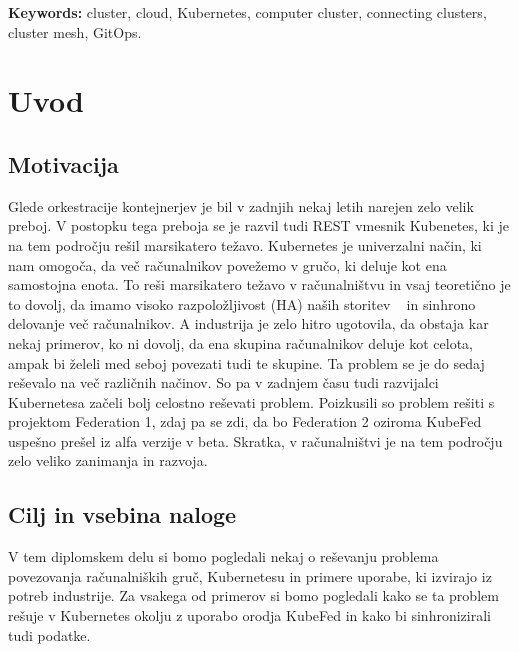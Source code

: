 \documentclass[a4paper, 12pt]{book}
\newcommand{\tkeywordsEn}{cluster, cloud, Kubernetes, computer cluster, connecting clusters, cluster mesh, GitOps}
\newcommand{\clearemptydoublepage}{\newpage{\pagestyle{empty}\cleardoublepage}}
\begin{document}
\bigskip
\noindent\textbf{Keywords:} \tkeywordsEn.
\clearemptydoublepage
\mainmatter
\setcounter{page}{1}
\pagestyle{fancy}
\chapter{Uvod}
\label{uvod}
\section{Motivacija}
Glede orkestracije kontejnerjev je bil v zadnjih nekaj letih narejen zelo velik preboj. 
V postopku tega preboja se je razvil tudi REST vmesnik Kubenetes, ki je na tem področju rešil marsikatero težavo.
Kubernetes  je univerzalni način, ki nam omogoča, da več računalnikov povežemo v gručo, ki deluje kot ena samostojna enota. 
To reši marsikatero težavo v računalništvu in vsaj teoretično je to dovolj, da imamo visoko razpoložljivost (HA) naših storitev ~\cite{mastering-Kubernetes} in sinhrono delovanje več računalnikov.
A industrija je zelo hitro ugotovila, da obstaja kar nekaj primerov, ko ni dovolj, da ena skupina računalnikov deluje kot celota, ampak bi želeli med seboj povezati tudi te skupine.
Ta problem se je do sedaj reševalo na več različnih načinov.
So pa v zadnjem času tudi razvijalci Kubernetesa začeli bolj celostno reševati problem.
Poizkusili so problem rešiti s projektom Federation 1, zdaj pa se zdi, da bo Federation 2 oziroma KubeFed uspešno prešel iz alfa verzije v beta.
Skratka, v računalništvi je na tem področju zelo veliko zanimanja in razvoja.
\section{Cilj in vsebina naloge}
V tem diplomskem delu si bomo pogledali nekaj o reševanju problema povezovanja računalniških gruč, Kubernetesu in primere uporabe, ki izvirajo iz potreb industrije. 
Za vsakega od primerov si bomo pogledali kako se ta problem rešuje v Kubernetes okolju z uporabo orodja KubeFed in kako bi sinhronizirali tudi podatke.
\end{document}
